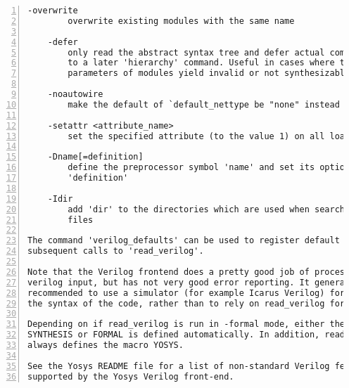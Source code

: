 \begin{lstlisting}[numbers=left,frame=single]
    -overwrite
        overwrite existing modules with the same name

    -defer
        only read the abstract syntax tree and defer actual compilation
        to a later 'hierarchy' command. Useful in cases where the default
        parameters of modules yield invalid or not synthesizable code.

    -noautowire
        make the default of `default_nettype be "none" instead of "wire".

    -setattr <attribute_name>
        set the specified attribute (to the value 1) on all loaded modules

    -Dname[=definition]
        define the preprocessor symbol 'name' and set its optional value
        'definition'

    -Idir
        add 'dir' to the directories which are used when searching include
        files

The command 'verilog_defaults' can be used to register default options for
subsequent calls to 'read_verilog'.

Note that the Verilog frontend does a pretty good job of processing valid
verilog input, but has not very good error reporting. It generally is
recommended to use a simulator (for example Icarus Verilog) for checking
the syntax of the code, rather than to rely on read_verilog for that.

Depending on if read_verilog is run in -formal mode, either the macro
SYNTHESIS or FORMAL is defined automatically. In addition, read_verilog
always defines the macro YOSYS.

See the Yosys README file for a list of non-standard Verilog features
supported by the Yosys Verilog front-end.
\end{lstlisting}

